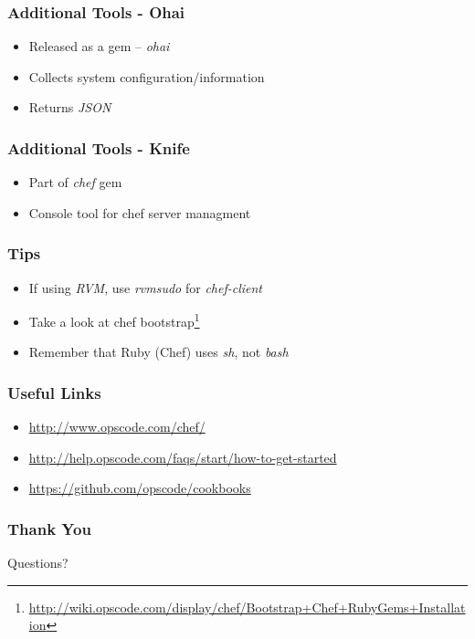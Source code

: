 \documentclass[16pt]{beamer}
\begin{document}
\begin{frame}
  \frametitle{Additional Tools - Ohai}
  \begin{itemize}
    \item Released as a gem -- \emph{ohai}
    \item Collects system configuration/information
    \item Returns \emph{JSON}
  \end{itemize}
\end{frame}

\begin{frame}
  \frametitle{Additional Tools - Knife}
  \begin{itemize}
    \item Part of \emph{chef} gem
    \item Console tool for chef server managment
  \end{itemize}
\end{frame}

\begin{frame}
  \frametitle{Tips}
  \begin{itemize}
    \item If using \emph{RVM}, use \emph{rvmsudo} for \emph{chef-client}
    \item Take a look at chef bootstrap\footnote{\url{http://wiki.opscode.com/display/chef/Bootstrap+Chef+RubyGems+Installation}}
    \item Remember that Ruby (Chef) uses \emph{sh}, not \emph{bash}
  \end{itemize}
\end{frame}

\begin{frame}
  \frametitle{Useful Links}
  \begin{footnotesize}
    \begin{itemize}
      \item \url{http://www.opscode.com/chef/}
      \item \url{http://help.opscode.com/faqs/start/how-to-get-started}
      \item \url{https://github.com/opscode/cookbooks}
    \end{itemize}
  \end{footnotesize}
\end{frame}

\begin{frame}
  \frametitle{Thank You}
  \begin{center}
    \Huge Questions?
  \end{center}
\end{frame}
\end{document}
